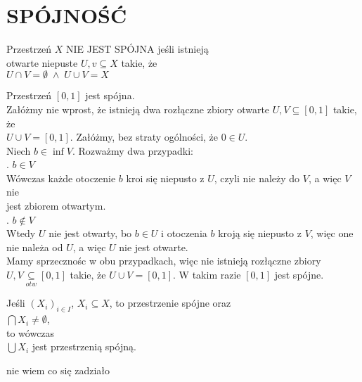 \section{SPÓJNOŚĆ}
\begin{center}\large
    Przestrzeń $X$ {\color{def}NIE JEST SPÓJNA} jeśli istnieją \\otwarte niepuste $U,v\subseteq X$ takie, że\smallskip\\
    $U\cap V=\emptyset\;\land\; U\cup V=X$
\end{center}
Przestrzeń $[0, 1]$ jest spójna.\bigskip\\
\dowod
Załóżmy nie wprost, że istnieją dwa rozłączne zbiory otwarte $U, V\subseteq [0,1]$ takie, że \\$U\cup V=[0,1]$. Załóżmy, bez straty ogólności, że $0\in U$.\smallskip\\
Niech $b\in \inf V$. Rozważmy dwa przypadki:\medskip\\
. $b\in V$\smallskip\\
Wówczas każde otoczenie $b$ kroi się niepusto z $U$, czyli nie należy do $V$, a więc $V$ nie \\jest zbiorem otwartym.\medskip\\
. $b\notin V$\smallskip\\
Wtedy $U$ nie jest otwarty, bo $b\in U$ i otoczenia $b$ kroją się niepusto z $V$, więc one nie należa od $U$, a więc $U$ nie jest otwarte.\medskip\\
Mamy sprzecznośc w obu przypadkach, więc nie istnieją rozłączne zbiory $U, V\underset{otw}\subseteq [0, 1]$ takie, że $U\cup V=[0,1]$. W takim razie $[0,1]$ jest spójne.
\kondow
{}\bigskip
\begin{center}\large
    Jeśli $(X_i)_{i\in I}$, $X_i\subseteq X$, to przestrzenie spójne oraz\smallskip\\
    $\bigcap X_i\neq \emptyset$,\smallskip\\
    to wówczas\smallskip\\
    $\bigcup X_i$ jest przestrzenią spójną.
\end{center}\bigskip
\dowod
{\color{cyan}nie wiem co się zadziało}

